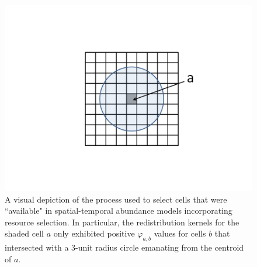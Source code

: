 \documentclass[times,mee,doublespace,]{besauth2}
\begin{document}




\pagebreak
\begin{figure}
\begin{center}
\includegraphics[width=170mm]{rs_kernel.png}
\caption{A visual depiction of the process used to select cells that were ``available" in spatial-temporal abundance models incorporating resource selection.  In particular, the redistribution kernels for the shaded cell $a$ only exhibited positive $\varphi_{a,b}$ values for cells $b$ that intersected with a 3-unit radius circle emanating from the centroid of $a$.} \label{fig:res-sel}
\end{center}
\end{figure}
\end{document}
